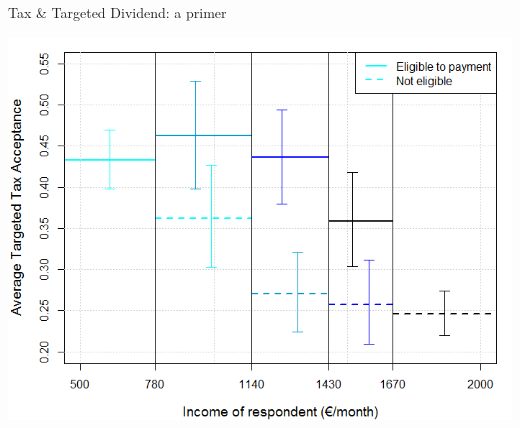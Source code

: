 \documentclass[aspectratio=169,9pt,dvipsnames]{beamer}
\begin{document}
\begin{frame}{Tax \& Targeted Dividend: a primer}
\begin{overprint}
\includegraphics[width=.7\textwidth,center]{Images/RDD_Acceptance_flat_90CI.png}
\end{overprint}
    \end{frame}
    





\end{document}
